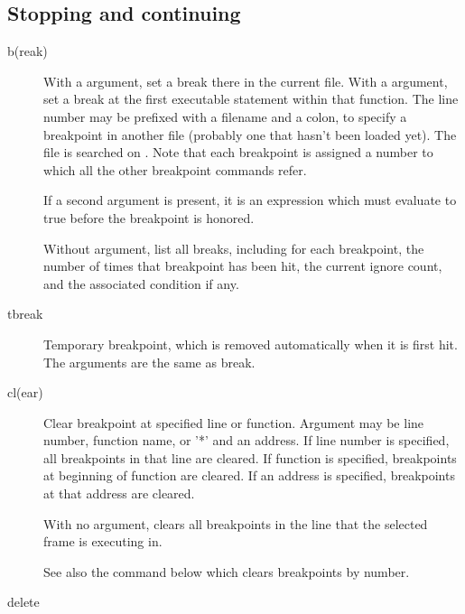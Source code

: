 \subsection{Stopping and continuing}
\begin{description}
\item[b(reak) ]

With a  argument, set a break there in the current
file.  With a  argument, set a break at the first
executable statement within that function.
The line number may be prefixed with a filename and a colon,
to specify a breakpoint in another file (probably one that
hasn't been loaded yet).  The file is searched on .
Note that each breakpoint is assigned a number to which all the other
breakpoint commands refer.

If a second argument is present, it is an expression which must
evaluate to true before the breakpoint is honored.

Without argument, list all breaks, including for each breakpoint,
the number of times that breakpoint has been hit, the current
ignore count, and the associated condition if any.

\item[tbreak ]

Temporary breakpoint, which is removed automatically when it is
first hit.  The arguments are the same as break.

\item[cl(ear) ]

Clear breakpoint at specified line or function.  Argument may be line
number, function name, or '*' and an address.  If line number is
specified, all breakpoints in that line are cleared.  If function is
specified, breakpoints at beginning of function are cleared.  If an
address is specified, breakpoints at that address are cleared.

With no argument, clears all breakpoints in the line that the selected
frame is executing in.

See also the  command below which clears breakpoints by
number.

\item[delete ]


\end{description}

